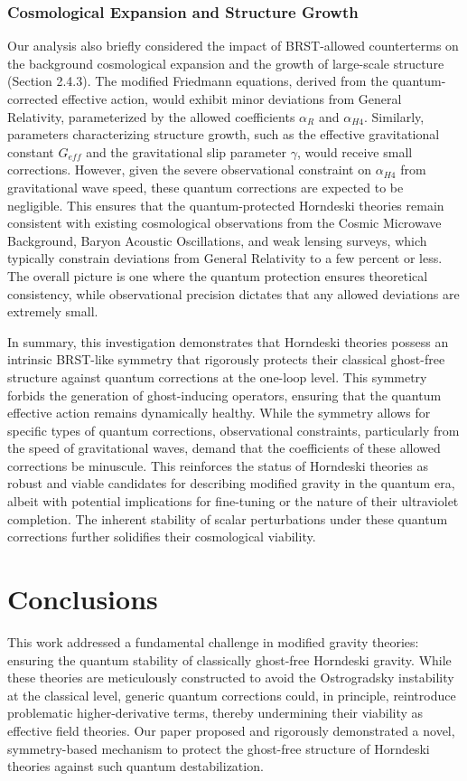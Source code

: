 \documentclass[twocolumn]{aastex631}
\begin{document}
\subsubsection{Cosmological Expansion and Structure Growth}
Our analysis also briefly considered the impact of BRST-allowed counterterms on the background cosmological expansion and the growth of large-scale structure (Section 2.4.3). The modified Friedmann equations, derived from the quantum-corrected effective action, would exhibit minor deviations from General Relativity, parameterized by the allowed coefficients $\alpha_R$ and $\alpha_{H4}$. Similarly, parameters characterizing structure growth, such as the effective gravitational constant $G_{eff}$ and the gravitational slip parameter $\gamma$, would receive small corrections. However, given the severe observational constraint on $\alpha_{H4}$ from gravitational wave speed, these quantum corrections are expected to be negligible. This ensures that the quantum-protected Horndeski theories remain consistent with existing cosmological observations from the Cosmic Microwave Background, Baryon Acoustic Oscillations, and weak lensing surveys, which typically constrain deviations from General Relativity to a few percent or less. The overall picture is one where the quantum protection ensures theoretical consistency, while observational precision dictates that any allowed deviations are extremely small.

In summary, this investigation demonstrates that Horndeski theories possess an intrinsic BRST-like symmetry that rigorously protects their classical ghost-free structure against quantum corrections at the one-loop level. This symmetry forbids the generation of ghost-inducing operators, ensuring that the quantum effective action remains dynamically healthy. While the symmetry allows for specific types of quantum corrections, observational constraints, particularly from the speed of gravitational waves, demand that the coefficients of these allowed corrections be minuscule. This reinforces the status of Horndeski theories as robust and viable candidates for describing modified gravity in the quantum era, albeit with potential implications for fine-tuning or the nature of their ultraviolet completion. The inherent stability of scalar perturbations under these quantum corrections further solidifies their cosmological viability.

\section{Conclusions}
\label{sec:conclusions}
This work addressed a fundamental challenge in modified gravity theories: ensuring the quantum stability of classically ghost-free Horndeski gravity. While these theories are meticulously constructed to avoid the Ostrogradsky instability at the classical level, generic quantum corrections could, in principle, reintroduce problematic higher-derivative terms, thereby undermining their viability as effective field theories. Our paper proposed and rigorously demonstrated a novel, symmetry-based mechanism to protect the ghost-free structure of Horndeski theories against such quantum destabilization.
\end{document}
